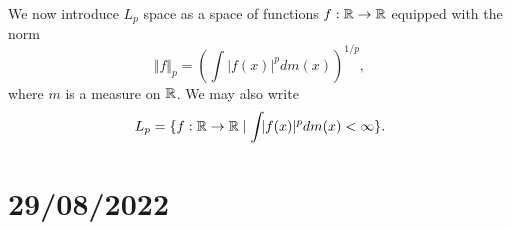\documentclass{amsart}
\begin{document}

We now introduce $L_p$ space as a space of functions $f: \mathbb{R} \to \mathbb{R}$ equipped with the norm 
\begin{equation}
\label{eq:3}
\Vert f \Vert_p = \left( \int |f(x)|^p dm(x) \right)^{1/p},
\end{equation}
where $m$ is a measure on $\mathbb{R}$. We may also write 
\begin{displaymath}
L_p = \{ f: \mathbb{R} \to \mathbb{R} \mid \int_{} |f(x)|^p dm(x) < \infty \}.
\end{displaymath}

\section{29/08/2022}
\end{document}
